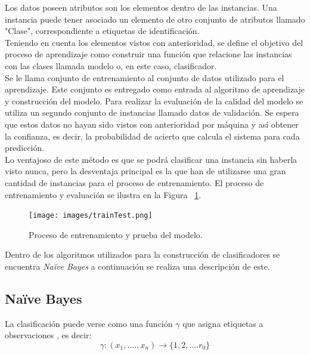 Los datos poseen atributos son los elementos dentro de las instancias. Una instancia puede tener asociado un elemento de otro conjunto de atributos llamado "Clase", correspondiente a etiquetas de identificación.\\

Teniendo en cuenta los elementos vistos con anterioridad, se define el objetivo del proceso de aprendizaje como construir una función que relacione las instancias con las clases llamada modelo o, en este caso, clasificador.\\

Se le llama conjunto de entrenamiento al conjunto de datos utilizado para el aprendizaje. Este conjunto es entregado como entrada al algoritmo de aprendizaje y construcción del modelo. Para realizar la evaluación de la calidad del modelo se utiliza un segundo conjunto de instancias llamado datos de validación. Se espera que estos datos no hayan sido vistos con anterioridad por máquina y así obtener la confianza, es decir, la probabilidad de acierto que calcula el sistema para cada predicción.\\

Lo ventajoso de este método es que se podrá clasificar una instancia sin haberla visto nunca, pero la desventaja principal es la que han de utilizarse una gran cantidad de instancias para el proceso de entrenamiento. El proceso de entrenamiento y evaluación se ilustra en la Figura ~\ref{fig:entrenamientoEvaluacion}.\\

\begin{figure}[H]
	\centering
	\captionsetup{justification=centering}
	\texttt{[image: images/trainTest.png]}
	\caption[Proceso de entrenamiento y prueba del modelo.]{Proceso de entrenamiento y prueba del modelo.}
	\label{fig:entrenamientoEvaluacion}
\end{figure}

Dentro de los algoritmos utilizados para la construcción de clasificadores se encuentra \textit{Naïve Bayes} \cite{NaiveBayes2} a continuación se realiza una descripción de este. 

	\subsection{Naïve Bayes}
	
	La clasificación puede verse como una función \begin{math}\gamma\end{math} que asigna etiquetas a observaciones \cite{NaiveBayes1}, es decir:\\ 
	\[\gamma : (x_{1}, .... , x_{n}) \rightarrow \{1, 2, .... r_{0}\} \]


